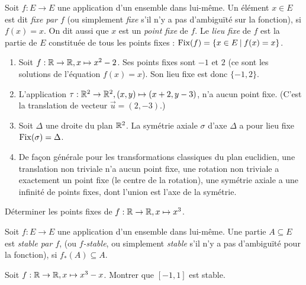 \begin{definition}\label{def-point-fixe}
Soit $f : E\to E$ une application d'un ensemble dans lui-même. Un élément $x\in E$ est dit \emph{fixe par $f$} (ou simplement \emph{fixe} s'il n'y a pas d'ambiguïté sur la fonction), si $f(x)=x$. On dit aussi que $x$ est un \emph{point fixe} de $f$. Le \emph{lieu fixe} de $f$ est la partie de $E$ constituée de tous les points fixes : $\operatorname{Fix}(f) = \{x\in E\:|\: f(x)=x \}$.
\end{definition}

\begin{exemple}
\begin{enumerate}
\item Soit $f : \mathbb{R}\to \mathbb{R}, x\mapsto x^2-2$. Ses points fixes sont $-1$ et $2$ (ce sont les solutions de l'équation $f(x)=x$). Son lieu fixe est donc $\{-1,2\}$.
\item L'application $\tau : \mathbb{R}^2\to \mathbb{R}^2, (x,y) \mapsto (x+2,y-3)$, n'a aucun point fixe. (C'est la translation de vecteur $\vec u = (2,-3)$.)
\item Soit $\Delta$ une droite du plan $\mathbb{R}^2$. La symétrie axiale $\sigma$ d'axe $\Delta$ a pour lieu fixe $\operatorname{Fix}(\sigma)=\Delta$.
\item De façon générale pour les transformations classiques du plan euclidien, une translation non triviale n'a aucun point fixe, une rotation non triviale a exactement un point fixe (le centre de la rotation), une symétrie axiale a une infinité de points fixes, dont l'union est l'axe de la symétrie.
\end{enumerate}
\end{exemple}

\begin{exercice}
Déterminer les points fixes de $f : \mathbb{R}\to \mathbb{R}, x\mapsto x^3$.
\end{exercice}

\begin{definition}
Soit $f : E\to E$ une application d'un ensemble dans lui-même. Une partie $A\subseteq E$ est \emph{stable par $f$}, (ou \emph{$f$-stable}, ou simplement \emph{stable} s'il n'y a pas d'ambiguïté pour la fonction), si $f_*(A)\subseteq A$.
\end{definition}

\begin{exercice}
Soit $f : \mathbb{R}\to \mathbb{R}, x\mapsto x^3-x$. Montrer que $[-1,1]$ est stable.
\end{exercice}

